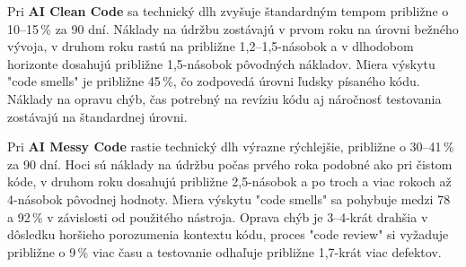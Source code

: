 Pri \textbf{AI Clean Code} sa technický dlh zvyšuje štandardným tempom približne o 10--15\,\% za 90 dní. Náklady na údržbu zostávajú v prvom roku na úrovni bežného vývoja, v druhom roku rastú na približne 1,2--1,5-násobok a v dlhodobom horizonte dosahujú približne 1,5-násobok pôvodných nákladov. Miera výskytu "code smells" je približne 45\,\%, čo zodpovedá úrovni ľudsky písaného kódu. Náklady na opravu chýb, čas potrebný na revíziu kódu aj náročnosť testovania zostávajú na štandardnej úrovni\cite{TECHNICALDEBT_2026}.

Pri \textbf{AI Messy Code} rastie technický dlh výrazne rýchlejšie, približne o 30--41\,\% za 90 dní. Hoci sú náklady na údržbu počas prvého roka podobné ako pri čistom kóde, v druhom roku dosahujú približne 2,5-násobok a po troch a viac rokoch až 4-násobok pôvodnej hodnoty. Miera výskytu "code smells" sa pohybuje medzi 78 a 92\,\% v závislosti od použitého nástroja. Oprava chýb je 3--4-krát drahšia v dôsledku horšieho porozumenia kontextu kódu, proces "code review" si vyžaduje približne o 9\,\% viac času a testovanie odhaľuje približne 1,7-krát viac defektov\cite{TECHNICALDEBT_2026}.